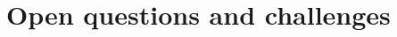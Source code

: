 \documentclass{beamer}
\newcommand\m[1]{\ensuremath{\mathcal{#1}}\xspace}
\newcommand\formula{\ensuremath{\m{F} }\xspace}
\renewcommand\emph[1]{{\color{vuborange}#1}}
\newcommand\subsetT{\m{\mathcal{S}}}
\newcommand\call[1]{\m{\textsc{#1}}}
\newcommand\setstohit{\m{\mathcal{H}}}
\newcommand\grow{\call{Grow}}
\newcommand\sat{\call{SAT}}
\newcommand\comus{\call{ocus}}
\newcommand\cohs{\call{optimal-hittingset}}
\begin{document}
			
			
			\section{Open questions and challenges}
			
\end{document}
